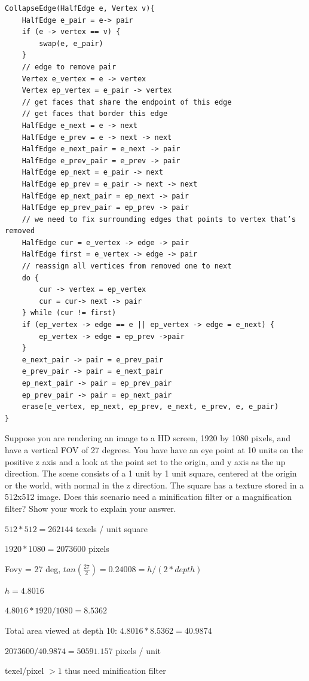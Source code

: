\documentclass[12pt]{article}
\newcommand{\name}{Mike Gao}
\newcommand{\problemset}{ FINAL EXAM }
\newcommand{\answer}[1]{
\newpage
\noindent
\framebox{
	\vbox{
		COMP 557 \hfill {\bf \problemset} \hfill Prof. Paul Kry \\ 
		\name \hfill \today \\
		260915701 \hfill \# #1
	}
}
\bigskip

}
\begin{document}
\newpage

\begin{verbatim}
CollapseEdge(HalfEdge e, Vertex v){
    HalfEdge e_pair = e-> pair
	if (e -> vertex == v) {
		swap(e, e_pair)
	}
	// edge to remove pair
	Vertex e_vertex = e -> vertex
	Vertex ep_vertex = e_pair -> vertex
	// get faces that share the endpoint of this edge
	// get faces that border this edge
	HalfEdge e_next = e -> next
	HalfEdge e_prev = e -> next -> next
	HalfEdge e_next_pair = e_next -> pair
	HalfEdge e_prev_pair = e_prev -> pair
	HalfEdge ep_next = e_pair -> next
	HalfEdge ep_prev = e_pair -> next -> next
	HalfEdge ep_next_pair = ep_next -> pair
	HalfEdge ep_prev_pair = ep_prev -> pair
	// we need to fix surrounding edges that points to vertex that’s removed
	HalfEdge cur = e_vertex -> edge -> pair
	HalfEdge first = e_vertex -> edge -> pair
	// reassign all vertices from removed one to next
	do {
		cur -> vertex = ep_vertex
		cur = cur-> next -> pair
	} while (cur != first)
	if (ep_vertex -> edge == e || ep_vertex -> edge = e_next) {
		ep_vertex -> edge = ep_prev ->pair
	}
	e_next_pair -> pair = e_prev_pair
	e_prev_pair -> pair = e_next_pair
	ep_next_pair -> pair = ep_prev_pair
	ep_prev_pair -> pair = ep_next_pair
	erase(e_vertex, ep_next, ep_prev, e_next, e_prev, e, e_pair)
}

\end{verbatim}

\answer{13}

Suppose you are rendering an image to a HD screen, 1920 by 1080 pixels, and have a vertical FOV of 27 degrees. You have have an eye point at 10 units on the positive z axis
and a look at the point set to the origin, and y axis as the up direction. The scene consists of a 1 unit by 1 unit square, centered at the origin or the world, with normal in the z direction.
The square has a texture stored in a 512x512 image. Does this scenario need a minification
filter or a magnification filter? Show your work to explain your answer.

\begin{center}

$512 * 512  = 262144$ texels / unit square

$1920 * 1080 = 2073600$ pixels

Fovy = 27 deg, $tan(\frac{27}{2}) = 0.24008 = h / (2 * depth)$

$h = 4.8016$

$4.8016 *1920 / 1080 = 8.5362$

Total area viewed at depth 10: $4.8016*8.5362 = 40.9874$

$2073600/40.9874=50591.157$ pixels / unit

texel/pixel $> 1$ thus need minification filter
\end{center}
\end{document}
